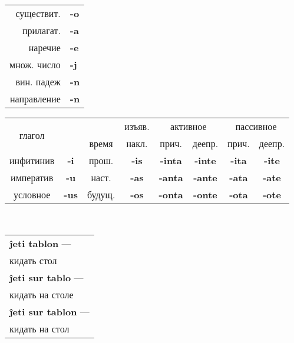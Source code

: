 \documentclass{article}
\def\b#1{\textbf{#1}}
\def\g{\cellcolor{gray!25}}
\begin{document}
\begin{tabular}{|r>{\bfseries}l|}
\hline
существит. & -o \\
прилагат. & -a \\
наречие & -e \\
множ. число & -j \\
вин. падеж & -n \\
направление & -n \\
\hline
\end{tabular}
\quad
\begin{tabular}{|cc|c|c|c|c|c|c|}
\hline
\multirow{2}{*}{глагол} & &\g &\g изъяв. &\multicolumn{2}{c|}{\g активное} & \multicolumn{2}{c|}{\g пассивное} \\
\cline{5-8}
& & \g время & \g накл. & \g прич. & \g деепр. & \g прич. & \g деепр. \\
\hline
инфитинив & \b{-i} & \g прош. & \b{-is} & \b{-inta} & \b{-inte} & \b{-ita} & \b{-ite} \\
\cline{3-8}
императив & \b{-u} & \g наст. & \b{-as} & \b{-anta} & \b{-ante} & \b{-ata} & \b{-ate} \\
\cline{3-8}
условное & \b{-us} & \g будущ. & \b{-os} & \b{-onta} & \b{-onte} & \b{-ota} & \b{-ote} \\
\hline
\end{tabular}
~
\begin{tabular}{l}
\b{ĵeti tablon} ---\\
\qquad кидать стол\\
\b{ĵeti sur tablo} ---\\
\qquad кидать на столе\\
\b{ĵeti sur tablon} ---\\
\qquad кидать на стол\\
\end{tabular}
\end{document}
